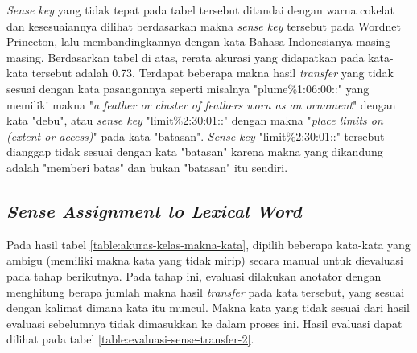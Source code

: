 \textit{Sense key} yang tidak tepat pada tabel tersebut ditandai dengan warna cokelat dan kesesuaiannya dilihat berdasarkan makna \textit{sense key} tersebut pada Wordnet Princeton, lalu membandingkannya dengan kata Bahasa Indonesianya masing-masing.
Berdasarkan tabel di atas, rerata akurasi yang didapatkan pada kata-kata tersebut adalah 0.73. Terdapat beberapa makna hasil \textit{transfer} yang tidak sesuai dengan kata pasangannya seperti misalnya "plume\%1:06:00::" yang memiliki makna "\textit{a feather or cluster of feathers worn as an ornament}" dengan kata "debu", atau \textit{sense key} "limit\%2:30:01::" dengan makna "\textit{place limits on (extent or access)}" pada kata "batasan". \textit{Sense key} "limit\%2:30:01::" tersebut dianggap tidak sesuai dengan kata "batasan" karena makna yang dikandung adalah "memberi batas" dan bukan "batasan" itu sendiri.

\subsection{\textit{Sense Assignment to Lexical Word}}

Pada hasil tabel \ref{table:akuras-kelas-makna-kata}, dipilih beberapa kata-kata yang ambigu (memiliki makna kata yang tidak mirip) secara manual untuk dievaluasi pada tahap berikutnya. Pada tahap ini, evaluasi dilakukan anotator dengan menghitung berapa jumlah makna hasil \textit{transfer} pada kata tersebut, yang sesuai dengan kalimat dimana kata itu muncul. Makna kata yang tidak sesuai dari hasil evaluasi sebelumnya tidak dimasukkan ke dalam proses ini. Hasil evaluasi dapat dilihat pada tabel \ref{table:evaluasi-sense-transfer-2}.

